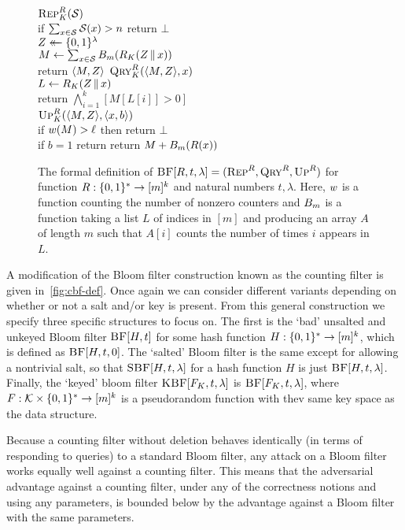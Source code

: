 \begin{figure}
  {
    \underline{$\textnormal{\textsc{Rep}}^R_K(\mathcal{S})$}\\[2pt]
      if $\sum_{x \in \mathcal{S}} \mathcal{S}(x) > n$ return $\bot$\\
      $Z \mathrel{\leftarrow\mkern-14mu\leftarrow} \{0,1\}^\lambda$\\
      $M \gets \sum_{x \in \mathcal{S}} {B}_m(R_K(Z \, \| \, x))$\\
      return $\langle M, Z \rangle$
  }
  {
    \underline{$\textnormal{\textsc{Qry}}^R_K(\langle M, Z \rangle,x)$}\\[2pt]
      $L \gets R_K(Z \, \| \, x)$\\
      return $\bigwedge_{i=1}^k [M[L[i]] > 0]$
    \\[6pt]
    \underline{$\textnormal{\textsc{Up}}^R_K(\langle M, Z \rangle,\langle x, b \rangle)$}\\[2pt]
      if ${w}(M) > \ell$ then return $\bot$\\
      if $b = 1$ return 
      return $M + {B}_m(R(x))$
  }
  \caption{The formal definition of $\textnormal{\textsc{BF}}[R,t,\lambda] = (\textnormal{\textsc{Rep}}^R,\textnormal{\textsc{Qry}}^R,\textnormal{\textsc{Up}}^R)$
  for function $R: \{0,1\}^* \to [m]^k$ and natural numbers $t, \lambda$. Here,
  ${w}$ is a function counting the number of nonzero counters and ${B}_m$ is a function taking a list $L$
  of indices in $[m]$ and producing an array $A$ of length $m$ such that $A[i]$ counts the number of times $i$ appears in $L$.}
  \label{fig:bcf-def}
\end{figure}

A modification of the Bloom filter construction known as the counting filter is given in~\ref{fig:cbf-def}. Once again we can consider different variants depending on whether or not a salt and/or key is present. From this
general construction we specify three specific structures to focus on. The first
is the `bad' unsalted and unkeyed Bloom filter $\textnormal{\textsc{BF}}[H,t]$ for some hash
function $H: \{0,1\}^* \to [m]^k$, which is defined as $\textnormal{\textsc{BF}}[H,t,0]$. The `salted'
Bloom filter is the same except for allowing a nontrivial salt, so that
$\textnormal{\textsc{SBF}}[H,t,\lambda]$ for a hash function $H$ is just $\textnormal{\textsc{BF}}[H,t,\lambda]$. Finally,
the `keyed' bloom filter $\textnormal{\textsc{KBF}}[F_K,t,\lambda]$ is $\textnormal{\textsc{BF}}[F_K,t,\lambda]$, where
$F: \mathcal{K} \times \{0,1\}^* \to [m]^k$ is a pseudorandom function with thev same key space as the data structure.

Because a counting filter without deletion behaves identically (in terms of
responding to queries) to a standard Bloom filter, any attack on a Bloom filter
works equally well against a counting filter. This means that the adversarial
advantage against a counting filter, under any of the correctness notions and
using any parameters, is bounded below by the advantage against a Bloom filter
with the same parameters.

